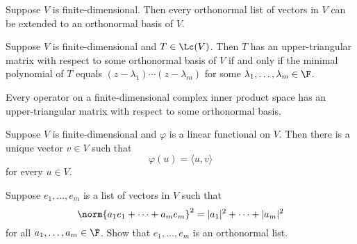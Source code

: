 \documentclass{extarticle}
\begin{document}
\begin{corollary}
    Suppose \(V\) is finite-dimensional. Then every orthonormal list of vectors in \(V\) can
    be extended to an orthonormal basis of \(V\).
\end{corollary}

\begin{lemma}
    Suppose \(V\) is finite-dimensional and \(T \in \Lc(V)\). Then \(T\) has an upper-triangular matrix
    with respect to some orthonormal basis of \(V\) if and only if the minimal polynomial of \(T\) equals
    \((z - \lambda_1) \cdots (z - \lambda_m)\) for some \(\lambda_1, \ldots, \lambda_m \in \F\).
\end{lemma}

\begin{thm}
    Every operator on a finite-dimensional complex inner product space has an upper-triangular matrix
    with respect to some orthonormal basis.
\end{thm}

\begin{thm}
    Suppose \(V\) is finite-dimensional and \(\varphi\) is a linear functional on \(V\). Then there
    is a unique vector \(v \in V\) such that
    \[\varphi(u) = \langle u,v \rangle\]
    for every \(u \in V\).
\end{thm}


\newpage
{}

\begin{problem}{1}
    Suppose \(e_1, \ldots, e_m\) is a list of vectors in \(V\) such that
    \[\norm{a_1 e_1 + \cdots + a_m e_m}^2 = |a_1|^2 + \cdots + |a_m|^2\]
    for all \(a_1, \ldots, a_m \in \F\). Show that \(e_1, \ldots, e_m\) is an orthonormal list.
\end{problem}
\end{document}
